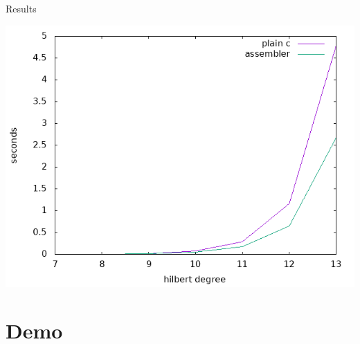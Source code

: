 \documentclass[12pt]{beamer}
\begin{document}
\begin{frame}[fragile]{Results}
    \begin{center}
        \includegraphics[width=\textwidth,height=0.8\textheight,keepaspectratio]
        {../img/result-plot.png}
    \end{center}
\end{frame}



\section{Demo}
\end{document}
